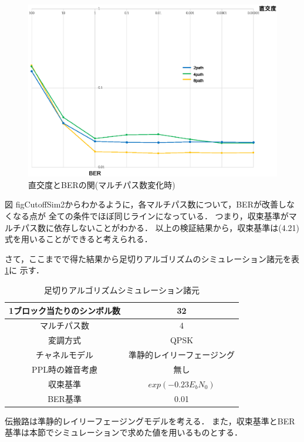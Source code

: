 \begin{figure}[ht]
    \centering
    \includegraphics[width=0.95\linewidth]{chapter4/figure/CutoffSim2.eps}
    \caption{直交度とBERの関(マルチパス数変化時)}
    \label{figCutoffSim2}
\end{figure}

図 {figCutoffSim2}からわかるように，各マルチパス数について，BERが改善しなくなる点が
全ての条件でほぼ同じラインになっている．
つまり，収束基準がマルチパス数に依存しないことがわかる．
以上の検証結果から，収束基準は(4.21)式を用いることができると考えられる．

さて，ここまでで得た結果から足切りアルゴリズムのシミュレーション諸元を表 \ref{tabCutoff3}に
示す．

\begin{table}[ht]
    \begin{tabular}{|c|c|} \hline
        1ブロック当たりのシンボル数 & 32 \\ \hline
        マルチパス数 & 4 \\ \hline
        変調方式 & QPSK \\ \hline
        チャネルモデル & 準静的レイリーフェージング \\ \hline
        PPL時の雑音考慮 & 無し \\ \hline
        収束基準 & $exp(-0.23E_bN_0)$ \\ \hline
        BER基準 & 0.01 \\ \hline
    \end{tabular}
    \centering
    \caption{足切りアルゴリズムシミュレーション諸元}
    \label{tabCutoff3}
\end{table}

伝搬路は準静的レイリーフェージングモデルを考える．
また，収束基準とBER基準は本節でシミュレーションで求めた値を用いるものとする．


